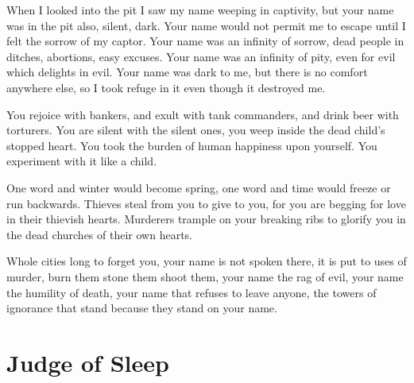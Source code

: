 \documentclass[english,11pt,letterpaper,onecolumn,parskip=full]{scrbook}
\begin{document}
\begin{poem}
\begin{stanza}
When I looked into the pit I saw my name weeping in captivity, but your name was in the pit also, silent, dark.\verseline
Your name would not permit me to escape until I felt the sorrow of my captor.  Your name was an infinity of sorrow, dead people in ditches, abortions, easy excuses.  Your name was an infinity of pity, even for evil which delights in evil.\verseline
Your name was dark to me, but there is no comfort anywhere else, so I took refuge in it even though it destroyed me.
\end{stanza}

\begin{stanza}
You rejoice with bankers, and exult with tank commanders, and drink beer with torturers.\verseline
You are silent with the silent ones, you weep inside the dead child's stopped heart.\verseline
You took the burden of human happiness upon yourself.  You experiment with it like a child.
\end{stanza}

\begin{stanza}
One word and winter would become spring, one word and time would freeze or run backwards.\verseline
Thieves steal from you to give to you, for you are begging for love in their thievish hearts.\verseline
Murderers trample on your breaking ribs to glorify you in the dead churches of their own hearts.
\end{stanza}

\begin{stanza}
Whole cities long to forget you, your name is not spoken there, it is put to uses of murder, burn them stone them shoot them, your name the rag of evil, your name the humility of death, your name that refuses to leave anyone, the towers of ignorance that stand because they stand on your name.
\end{stanza}
\end{poem}

\newpage
\section{Judge of Sleep}
\end{document}
